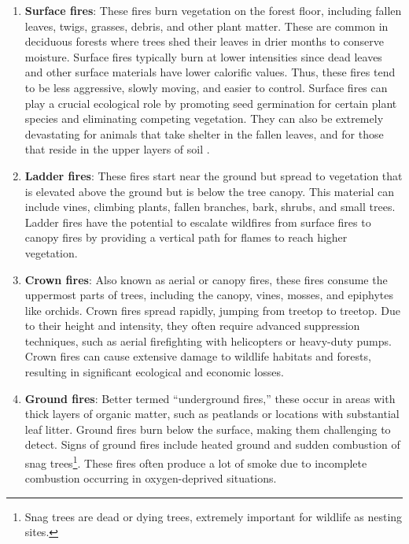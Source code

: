 \documentclass[
  12 pt,
]{Nemilov}
\begin{document}
\begin{enumerate}
\def\labelenumi{\arabic{enumi}.}
\item
  \textbf{Surface fires}: These fires burn vegetation on the forest floor, including fallen leaves, twigs, grasses, debris, and other plant matter. These are common in deciduous forests where trees shed their leaves in drier months to conserve moisture. Surface fires typically burn at lower intensities since dead leaves and other surface materials have lower calorific values. Thus, these fires tend to be less aggressive, slowly moving, and easier to control. Surface fires can play a crucial ecological role by promoting seed germination for certain plant species and eliminating competing vegetation. They can also be extremely devastating for animals that take shelter in the fallen leaves, and for those that reside in the upper layers of soil \citep{certini2021impact}.
\item
  \textbf{Ladder fires}: These fires start near the ground but spread to vegetation that is elevated above the ground but is below the tree canopy. This material can include vines, climbing plants, fallen branches, bark, shrubs, and small trees. Ladder fires have the potential to escalate wildfires from surface fires to canopy fires by providing a vertical path for flames to reach higher vegetation.
\item
  \textbf{Crown fires}: Also known as aerial or canopy fires, these fires consume the uppermost parts of trees, including the canopy, vines, mosses, and epiphytes like orchids. Crown fires spread rapidly, jumping from treetop to treetop. Due to their height and intensity, they often require advanced suppression techniques, such as aerial firefighting with helicopters or heavy-duty pumps. Crown fires can cause extensive damage to wildlife habitats and forests, resulting in significant ecological and economic losses.
\item
  \textbf{Ground fires}: Better termed ``underground fires,'' these occur in areas with thick layers of organic matter, such as peatlands or locations with substantial leaf litter. Ground fires burn below the surface, making them challenging to detect. Signs of ground fires include heated ground and sudden combustion of snag trees\footnote{Snag trees are dead or dying trees, extremely important for wildlife as nesting sites.}. These fires often produce a lot of smoke due to incomplete combustion occurring in oxygen-deprived situations.
\end{enumerate}
\end{document}

